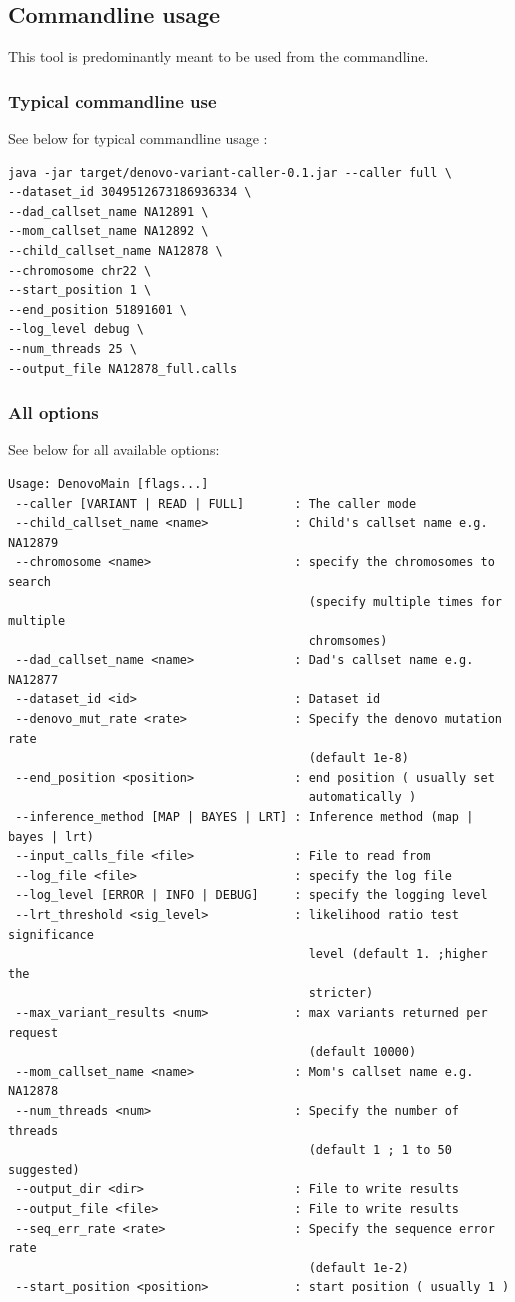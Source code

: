 \documentclass{article}
\begin{document}
\subsection{Commandline usage}
This tool is predominantly meant to be used from the commandline.

\subsubsection*{Typical commandline use}
See below for typical commandline usage :

\begin{verbatim}
java -jar target/denovo-variant-caller-0.1.jar --caller full \
--dataset_id 3049512673186936334 \
--dad_callset_name NA12891 \
--mom_callset_name NA12892 \
--child_callset_name NA12878 \
--chromosome chr22 \
--start_position 1 \
--end_position 51891601 \
--log_level debug \
--num_threads 25 \
--output_file NA12878_full.calls
\end{verbatim}


\subsubsection*{All options}
See below for all available options:

\begin{verbatim}
Usage: DenovoMain [flags...]
 --caller [VARIANT | READ | FULL]       : The caller mode
 --child_callset_name <name>            : Child's callset name e.g. NA12879
 --chromosome <name>                    : specify the chromosomes to search
                                          (specify multiple times for multiple
                                          chromsomes)
 --dad_callset_name <name>              : Dad's callset name e.g. NA12877
 --dataset_id <id>                      : Dataset id
 --denovo_mut_rate <rate>               : Specify the denovo mutation rate
                                          (default 1e-8)
 --end_position <position>              : end position ( usually set
                                          automatically )
 --inference_method [MAP | BAYES | LRT] : Inference method (map | bayes | lrt)
 --input_calls_file <file>              : File to read from
 --log_file <file>                      : specify the log file
 --log_level [ERROR | INFO | DEBUG]     : specify the logging level
 --lrt_threshold <sig_level>            : likelihood ratio test significance
                                          level (default 1. ;higher the
                                          stricter)
 --max_variant_results <num>            : max variants returned per request
                                          (default 10000)
 --mom_callset_name <name>              : Mom's callset name e.g. NA12878
 --num_threads <num>                    : Specify the number of threads
                                          (default 1 ; 1 to 50 suggested)
 --output_dir <dir>                     : File to write results
 --output_file <file>                   : File to write results
 --seq_err_rate <rate>                  : Specify the sequence error rate
                                          (default 1e-2)
 --start_position <position>            : start position ( usually 1 )
\end{verbatim}
\end{document}
